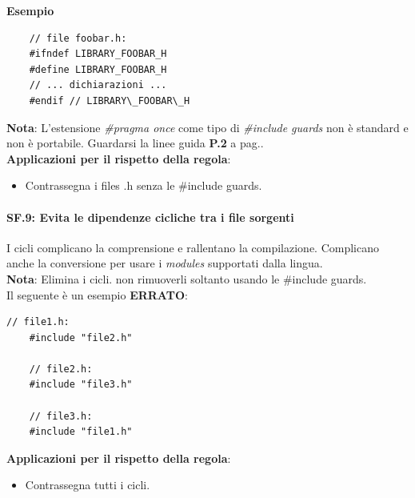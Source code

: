 \textsf{\small \textbf{Esempio}}

\begin{lstlisting}
	// file foobar.h:
	#ifndef LIBRARY_FOOBAR_H
	#define LIBRARY_FOOBAR_H
	// ... dichiarazioni ...
	#endif // LIBRARY\_FOOBAR\_H
\end{lstlisting}

\textsf{\small \textbf{Nota}: L'estensione \emph{\#pragma once} come tipo di \emph{\#include guards} non è standard e non è portabile. Guardarsi la linee guida \textbf{P.2} a pag.\pageref{P_2}.} \\

\textsf{\small \textbf{Applicazioni per il rispetto della regola}: }

\begin{itemize}
	\item \textsf{\small Contrassegna i files .h senza le \#include guards.}
\end{itemize}

\paragraph{SF.9: Evita le dipendenze cicliche tra i file sorgenti}

\textsf{\small I cicli complicano la comprensione e rallentano la compilazione. Complicano anche la conversione per usare i \emph{modules} supportati dalla lingua.} \\

\textsf{\small \textbf{Nota}: Elimina i cicli. non rimuoverli soltanto usando le \#include guards.} \\

\textsf{\small Il seguente è un esempio \textbf{\color{red}ERRATO}\normalcolor:}

\begin{lstlisting}[frame=single, rulecolor=\color{red}]
	// file1.h:
	#include "file2.h"
	
	// file2.h:
	#include "file3.h"
	
	// file3.h:
	#include "file1.h"
\end{lstlisting}

\textsf{\small \textbf{Applicazioni per il rispetto della regola}: }

\begin{itemize}
	\item \textsf{\small Contrassegna tutti i cicli.}
\end{itemize}

